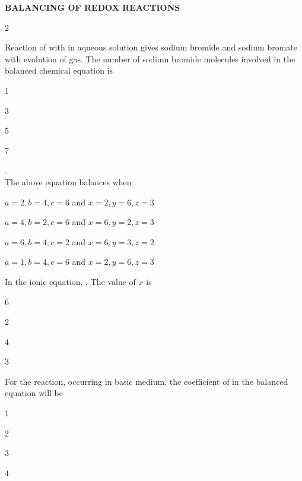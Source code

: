 \documentclass[10pt,a4paper]{article}
\begin{document}
\begin{mdframed}[backgroundcolor=sectionbg, linewidth=0pt, innerleftmargin=6pt, innerrightmargin=6pt, innertopmargin=4pt, innerbottommargin=4pt]
\color{white}\bfseries\small\centering BALANCING OF REDOX REACTIONS
\end{mdframed}

\begin{multicols}{2}
\begin{questions}[start=107]

\item Reaction of  with  in aqueous solution gives sodium bromide and sodium bromate with evolution of  gas. The number of sodium bromide molecules involved in the balanced chemical equation is
\begin{options}
  \item 1
  \item 3
  \item 5
  \item 7
\end{options}

\item {}.\\
The above equation balances when
\begin{options}
  \item $a=2, b=4, c=6$ and $x=2, y=6, z=3$
  \item $a=4, b=2, c=6$ and $x=6, y=2, z=3$
  \item $a=6, b=4, c=2$ and $x=6, y=3, z=2$
  \item $a=1, b=4, c=6$ and $x=2, y=6, z=3$
\end{options}

\item In the ionic equation, . The value of $x$ is
\begin{options}
  \item 6
  \item 2
  \item 4
  \item 3
\end{options}

\item For the reaction,  occurring in basic medium, the coefficient of  in the balanced equation will be
\begin{options}[start=1]
  \item 1
  \item 2
  \item 3
  \item 4
\end{options}


\end{questions}
\end{multicols}
\end{document}
